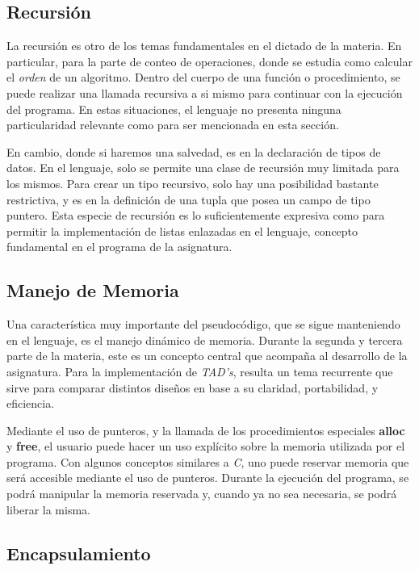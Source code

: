 \subsection{Recursión}

La recursión es otro de los temas fundamentales en el dictado de la materia.
En particular, para la parte de conteo de operaciones, donde se estudia como calcular el \textit{orden} de un algoritmo.
Dentro del cuerpo de una función o procedimiento, se puede realizar una llamada recursiva a si mismo para continuar con la ejecución del programa.
En estas situaciones, el lenguaje no presenta ninguna particularidad relevante como para ser mencionada en esta sección.

En cambio, donde si haremos una salvedad, es en la declaración de tipos de datos.
En el lenguaje, solo se permite una clase de recursión muy limitada para los mismos.
Para crear un tipo recursivo, solo hay una posibilidad bastante restrictiva, y es en la definición de una tupla que posea un campo de tipo puntero.
Esta especie de recursión es lo suficientemente expresiva como para permitir la implementación de listas enlazadas en el lenguaje, concepto fundamental en el programa de la asignatura.

\subsection{Manejo de Memoria}

Una característica muy importante del pseudocódigo, que se sigue manteniendo en el lenguaje, es el manejo dinámico de memoria.
Durante la segunda y tercera parte de la materia, este es un concepto central que acompaña al desarrollo de la asignatura.
Para la implementación de \textit{TAD's}, resulta un tema recurrente que sirve para comparar distintos diseños en base a su claridad, portabilidad, y eficiencia.

Mediante el uso de punteros, y la llamada de los procedimientos especiales \textbf{alloc} y \textbf{free}, el usuario puede hacer un uso explícito sobre la memoria utilizada por el programa.
Con algunos conceptos similares a \textit{C}, uno puede reservar memoria que será accesible mediante el uso de punteros.
Durante la ejecución del programa, se podrá manipular la memoria reservada y, cuando ya no sea necesaria, se podrá liberar la misma.

\subsection{Encapsulamiento}

